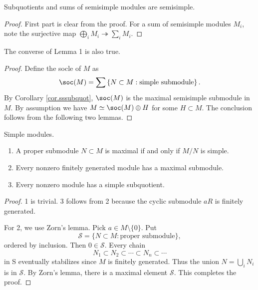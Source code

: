 \documentclass{article}
\begin{document}
\begin{corollary}\label{cor.sssubquot}
    Subquotients and sums of semisimple modules are semisimple.
\end{corollary}

\begin{proof}
    First part is clear from the proof. For a sum of semisimple modules $M_i$, note the surjective map $\bigoplus_{i}M_i\twoheadrightarrow\sum_iM_i$.
\end{proof}

\begin{proposition}
    The converse of Lemma 1 is also true.
\end{proposition}

\begin{proof}
    Define the socle of $M$ as 
    \begin{equation*}
        \soc(M)=\sum\left\{N\subset M:\text{simple submodule}\right\}.
    \end{equation*}
    By Corollary \ref{cor.sssubquot}, $\soc(M)$ is the maximal semisimple submodule in $M$. By assumption we have $M\simeq \soc(M)\oplus H$ for some $H\subset M$. The conclusion follows from the following two lemmas.
\end{proof}

\begin{lemma}
    Simple modules.
    \begin{enumerate}[nosep]
        \item A proper submodule $N\subset M$ is maximal if and only if $M/N$ is simple.
        \item Every nonzero finitely generated module has a maximal submodule.
        \item Every nonzero module has a simple subquotient.
    \end{enumerate}
\end{lemma}

\begin{proof}
    1 is trivial. 3 follows from 2 because the cyclic submodule $aR$ is finitely generated.

    For 2, we use Zorn's lemma. Pick $a\in M\setminus\{0\}$. Put
    \begin{equation*}
        \mathcal{S}=\{N\subset M:\text{proper submodule}\},
    \end{equation*}
    ordered by inclusion. Then $0\in \mathcal{S}$. Every chain 
    \begin{equation*}
        N_1\subset N_2\subset \cdots\subset N_n\subset \cdots
    \end{equation*}
    in S eventually stabilizes since $M$ is finitely generated. Thus the union $N=\bigcup_{i}N_i$ is in $\mathcal{S}$.
    By Zorn's lemma, there is a maximal element $\mathcal{S}$. This completes the proof.
\end{proof}
\end{document}
